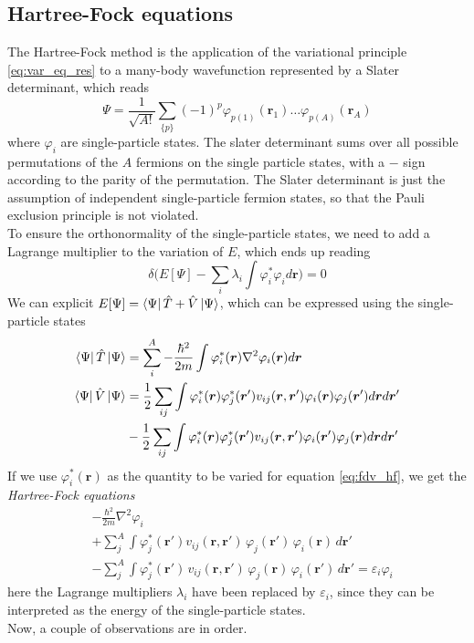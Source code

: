 \subsection{Hartree-Fock equations}
The Hartree-Fock method is the application of the variational principle \ref{eq:var_eq_res} to a many-body wavefunction represented by a Slater determinant, which reads
\begin{equation}
    \label{eq:slater_formula}
    \Psi = \frac{1}{\sqrt {A!}} \sum_{\{p\}} (-1)^{p}  \varphi_{p(1)}(\bm r_1)\ldots \varphi_{p(A)}(\bm r_A)
\end{equation}
where $\varphi_i$ are single-particle states.
The slater determinant sums over all possible permutations of the $A$ fermions on the single particle states, with a $-$ sign according to the parity of the permutation.
The Slater determinant is just the assumption of independent single-particle fermion states, so that the Pauli exclusion principle is not violated.
\\To ensure the orthonormality of the single-particle states, we need to add a Lagrange multiplier to the variation of $E$, which ends up reading
\begin{equation}
    \label{eq:fdv_hf}
\delta \bigg(E[\Psi] - \sum_i\lambda_i \int \varphi_i^*\varphi_i d\bm r \bigg) = 0
\end{equation}
We can explicit $E[\Psi] = \bra{\Psi} \hat T + \hat V\ket \Psi$, which can be expressed using the single-particle states 
\begin{align}
    \label{eq:exp_T_V}
    \bra\Psi\hat T\ket \Psi &= \sum_i^A -\frac{\hbar^2}{2m}\int \varphi_i^*(\bm r) \nabla^2 \varphi_i(\bm r) d\bm r\\
    \bra\Psi\hat V\ket \Psi &= \frac 1 2 \sum_{ij}\int\varphi_i^*(\bm r) \varphi_j^*(\bm r') v_{ij}(\bm r, \bm r')\varphi_i(\bm r)\varphi_j(\bm r') d\bm r d\bm r'\\
    &- \frac 1 2 \sum_{ij}\int \varphi_i^*(\bm r) \varphi_j^*(\bm r') v_{ij}(\bm r, \bm r')\varphi_i(\bm r')\varphi_j(\bm r) d\bm r d\bm r'
\end{align}
If we use $\varphi_i^*(\bm r)$ as the quantity to be varied for equation \ref{eq:fdv_hf}, we get the \textit{Hartree-Fock equations}
\begin{align}
    \label{eq:hf_equations}
    &-\frac{\hbar^2}{2m} \nabla^2 \varphi_i\\
    &+ \sum_{j}^A \int \varphi_j^* (\mathbf r') 
        v_{ij}(\mathbf r, \mathbf r')\, 
        \varphi_j (\mathbf r')\, 
        \varphi_i (\mathbf r)\, d\mathbf r'\label{eq:hartree} \\
    &- \sum_{j}^A \int \varphi_j^* (\mathbf r')\, 
        v_{ij}(\mathbf r, \mathbf r')\,
        \varphi_j (\mathbf r)\,
        \varphi_i (\mathbf r')\, d\mathbf r'\label{eq:fock}
        = \varepsilon_i \varphi_i
\end{align}
here the Lagrange multipliers $\lambda_i$ have been replaced by $\varepsilon_i$, since they can be interpreted as the energy of the single-particle states.\\
Now, a couple of observations are in order.

